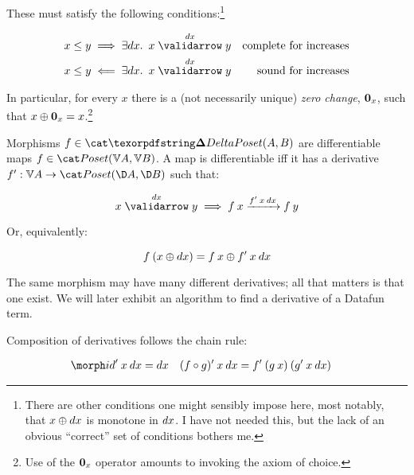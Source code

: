 \documentclass{rntz}\usepackage[a5]{rntzgeometry}\usepackage[fullwidth=130mm,width=330pt,]{narrow}
\begin{document}
\noindent
These must satisfy the following conditions:\footnote{There are other conditions
  one might sensibly impose here, most notably, that $x \mathbin{\oplus} dx$ is monotone in
  $dx$. I have not needed this, but the lack of an obvious ``correct'' set of
  conditions bothers me.}

\nopagebreak[2]
\begin{align*}
  x \le y &\implies \ex{\dx} \vld{\dx} x y
  & \text{complete for increases}\\
  x \le y &\impliedby \ex{\dx} \vld{\dx} x y
  & \text{sound for increases}
\end{align*}

\noindent In particular, for every $x$ there is a (not necessarily unique)
\emph{zero change}, $\boldsymbol{0}_x$, such that $x \mathbin{\oplus} \boldsymbol{0}_x = x$.\footnote{Use of
  the $\boldsymbol{0}_x$ operator amounts to invoking the axiom of choice.}

Morphisms $f \in \CP(A,B)$ are differentiable maps $f \in \Poset(\vals A, \vals
B)$. A map is differentiable iff it has a derivative $\deriv f : \vals A \to
\Poset(\chgs A, \chgs B)$ such that:

\nopagebreak[2]
\[ \vld{\dx} x y \implies \longvld{\deriv f\<x\<\dx}{f\<x}{f\<y}\]

\noindent Or, equivalently:

\nopagebreak[2]
\[ f\<(x \upd \dx) = f\<x \upd \deriv f\<x\<\dx \]


\noindent
The same morphism may have many different derivatives; all that matters is that
one exist. We will later exhibit an algorithm to find a derivative of a Datafun
term.

Composition of derivatives follows the chain rule:

\nopagebreak[2]
\begin{align*}
  \deriv\id \<x\<\dx &= \dx
  & \deriv{(f \circ g)} \<x\<\dx &= \deriv f \<(g\<x) \<(\deriv g\<x\<\dx)
\end{align*}



\end{document}

